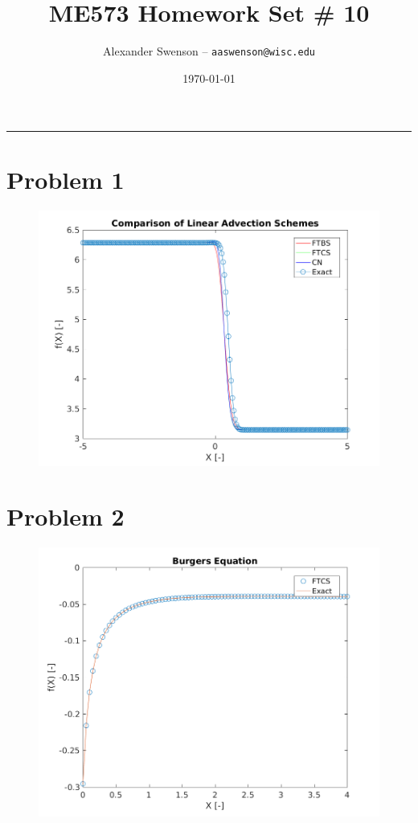 \documentclass[12pt]{article}
\title{ME573 Homework Set \# 10}
\author{Alexander Swenson -- \texttt{aaswenson@wisc.edu}}
\date{\today}
\begin{document}
	
	\maketitle
	
	\vspace{-0.3in}
	\noindent
	\rule{\linewidth}{0.4pt}
	
	\noindent
	

\section{Problem 1}
	
	\begin{figure}[!htb]
		\centering
		\includegraphics[scale=0.75]{problem1.png}
	\end{figure}

\newpage
\section{Problem 2}
	
	\begin{figure}[!htb]
		\centering
		\includegraphics[scale=0.75]{problem2_ftcs.png}
	\end{figure}
\end{document}
